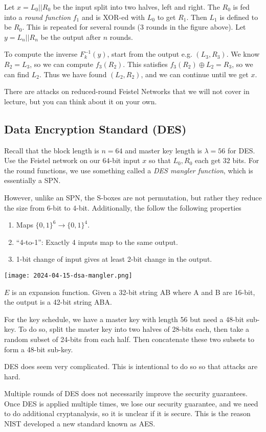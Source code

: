 Let $x = L_0 || R_0$ be the input split into two halves, left and right. The $R_0$ is fed into a \textit{round function} $f_1$ and is XOR-ed with $L_0$ to get $R_1$. Then $L_1$ is defined to be $R_0$. This is repeated for several rounds (3 rounds in the figure above). Let $y= L_n || R_n$ be the output after $n$ rounds.

To compute the inverse $F_k^{-1}(y)$, start from the output e.g. $(L_3, R_3)$. We know $R_2 = L_3$, so we can compute $f_3(R_2)$. This satisfies $f_3(R_2) \oplus L_2 = R_3$, so we can find $L_2$. Thus we have found $(L_2, R_2)$, and we can continue until we get $x$.

There are attacks on reduced-round Feistel Networks that we will not cover in lecture, but you can think about it on your own.

\subsection{Data Encryption Standard (DES)}

Recall that the block length is $n=64$ and master key length is $\lambda = 56$ for DES. Use the Feistel network on our $64$-bit input $x$ so that $L_0, R_0$ each get $32$ bits. For the round functions, we use something called a \textit{DES mangler function}, which is essentially a SPN.

However, unlike an SPN, the S-boxes are not permutation, but rather they reduce the size from 6-bit to 4-bit. Additionally, the follow the following properties
\begin{enumerate}
    \item Maps $\{0, 1\}^6 \to \{0, 1\}^4$.
    \item ``4-to-1'': Exactly 4 inputs map to the same output.
    \item 1-bit change of input gives at least 2-bit change in the output.
\end{enumerate}

\begin{center}
    \texttt{[image: 2024-04-15-dsa-mangler.png]}
\end{center}

$E$ is an expansion function. Given a 32-bit string AB where A and B are 16-bit, the output is a 42-bit string ABA.

For the key schedule, we have a master key with length 56 but need a 48-bit sub-key. To do so, split the master key into two halves of 28-bits each, then take a random subset of 24-bits from each half. Then concatenate these two subsets to form a 48-bit sub-key.

\begin{remark}
    DES does seem very complicated. This is intentional to do so so that attacks are hard.

    Multiple rounds of DES does not necessarily improve the security guarantees. Once DES is applied multiple times, we lose our security guarantee, and we need to do additional cryptanalysis, so it is unclear if it is secure. This is the reason NIST developed a new standard known as AES.
\end{remark}

